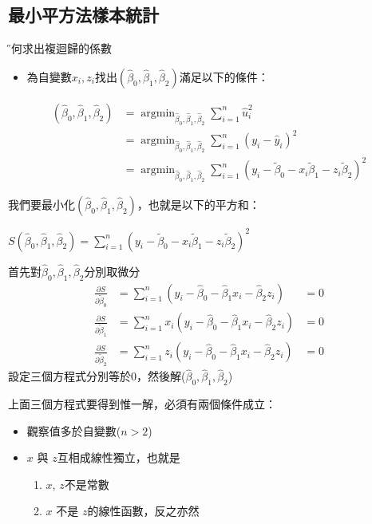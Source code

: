 \documentclass[xcolor=dvipsnames]{beamer}
\DeclareMathOperator*{\argmin}{argmin}
\begin{document}
\subsection{最小平方法樣本統計}
\begin{frame}{\H 如何求出複迴歸的係數}
\begin{itemize}
\item 為自變數$x_{i},z_{i}$找出$(\hat{\beta}_{0},\hat{\beta}_{1},\hat{\beta}_{2}) $滿足以下的條件：
\end{itemize}
\begin{align*}
(\hat{\beta}_{0},\hat{\beta}_{1},\hat{\beta}_{2}) & =\argmin_{\hat{\beta}_{0},\hat{\beta}_{1},\hat{\beta}_{2}}\sum\limits_{i=1}^n \hat{u}_{i}^2  \\
& = \argmin_{\hat{\beta}_{0},\hat{\beta}_{1},\hat{\beta}_{2}}\sum\limits_{i=1}^n(y_{i}- \hat{y}_{i})^2  \\
& = \argmin_{\hat{\beta}_{0},\hat{\beta}_{1},\hat{\beta}_{2}}\sum\limits_{i=1}^n (y_{i}-\tilde{\beta}_{0}-x_{i}\tilde{\beta}_{1}-z_{i}\tilde{\beta}_{2})^2 
\end{align*}
\end{frame}
\begin{frame}
我們要最小化$ (\hat{\beta}_{0},\hat{\beta}_{1},\hat{\beta}_{2}) $，也就是以下的平方和：
\begin{center}
$S(\hat{\beta}_{0},\hat{\beta}_{1},\hat{\beta}_{2})  =\sum\limits_{i=1}^n (y_{i}-\tilde{\beta}_{0}-x_{i}\tilde{\beta}_{1}-z_{i}\tilde{\beta}_{2})^2 $
\end{center}
首先對$\hat{\beta}_{0},\hat{\beta}_{1},\hat{\beta}_{2}$分別取微分
\begin{align*}
\frac{\partial S}{\partial \tilde{\beta}_{0}}& =\sum\limits_{i=1}^n(y_{i}-\hat{\beta}_{0}-\hat{\beta}_{1}x_{i}-\hat{\beta}_{2}z_{i})&=0\\
\frac{\partial S}{\partial \tilde{\beta}_{1}}&  =\sum\limits_{i=1}^nx_{i}(y_{i}-\hat{\beta}_{0}-\hat{\beta}_{1}x_{i}-\hat{\beta}_{2}z_{i})&=0\\
\frac{\partial S}{\partial\tilde{\beta}_{2}}& =\sum\limits_{i=1}^nz_{i}(y_{i}-\hat{\beta}_{0}-\hat{\beta}_{1}x_{i}-\hat{\beta}_{2}z_{i})&=0
\end{align*}
設定三個方程式分別等於0，然後解($ \hat{\beta}_{0}, \hat{\beta}_{1},\hat{\beta}_{2} $)
\end{frame}
\begin{frame}
上面三個方程式要得到惟一解，必須有兩個條件成立：
\begin{itemize}
\item 觀察值多於自變數($n>2$)
\item $x$ 與 $z$互相成線性獨立，也就是
\begin{enumerate}
\item $x$, $z$不是常數
\item $x$ 不是 $z$的線性函數，反之亦然
\end{enumerate}
\end{itemize}
\end{frame}
\end{document}
